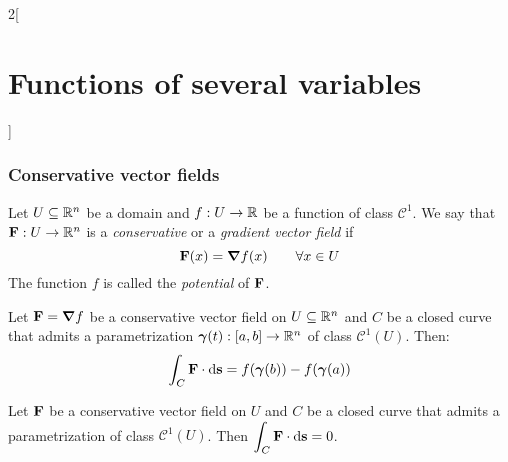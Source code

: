 \documentclass[../../../main.tex]{subfiles}
\begin{document}
\begin{multicols}{2}[\section{Functions of several variables}]
  \subsubsection{Conservative vector fields}
  \begin{definition}
    Let $U\subseteq\mathbb{R}^n$ be a domain and $f:U\rightarrow\mathbb{R} $ be a function of class $\mathcal{C}^1$. We say that $\boldsymbol{\mathrm{F}}:U\rightarrow\mathbb{R}^n$ is a \textit{conservative} or a \textit{gradient vector field} if $$\boldsymbol{\mathrm{F}}(x)=\grad f(x)\qquad \forall x\in U$$ The function $f$ is called the \textit{potential} of $\boldsymbol{\mathrm{F}}$.
  \end{definition}
  \begin{theorem}
    Let $\boldsymbol{\mathrm{F}}=\grad f$ be a conservative vector field on $U\subseteq\mathbb{R}^n$ and $C$ be a closed curve that admits a parametrization $\boldsymbol{\mathrm{\gamma}}(t):[a,b]\rightarrow\mathbb{R}^n$ of class $\mathcal{C}^1(U)$. Then: $$\int_C\boldsymbol{\mathrm{F}}\cdot \dd \boldsymbol{\mathrm{s}}=f(\boldsymbol{\mathrm{\gamma}}(b))-f(\boldsymbol{\mathrm{\gamma}}(a))$$
  \end{theorem}
  \begin{corollary}
    Let $\boldsymbol{\mathrm{F}}$ be a conservative vector field on $U$ and $C$ be a closed curve that admits a parametrization of class $\mathcal{C}^1(U)$. Then $\displaystyle\int_C\boldsymbol{\mathrm{F}}\cdot \dd \boldsymbol{\mathrm{s}}=0$.
  \end{corollary}

\end{multicols}
\end{document}
